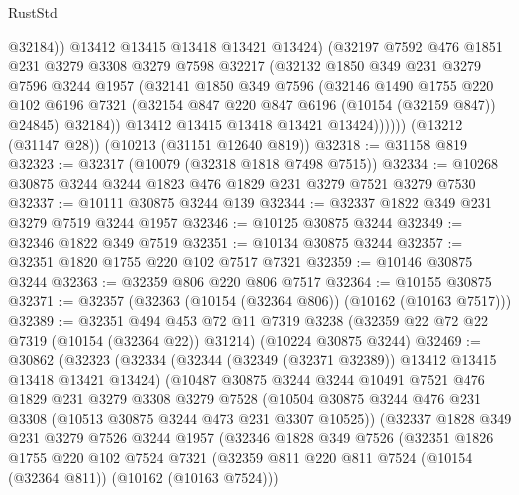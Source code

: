 \begin{lexlean}{RustStd}
\begin{coremodule}
{\begin{coremodule}
{{{{{{{{{{{{{{{{{{{{{{{{{{                  @32184))
              @13412
              @13415
              @13418
              @13421
              @13424)
            (@32197
              @7592
              @476
              @1851
              @231
              @3279
              @3308
              @3279
              @7598
              @32217
              (@32132
                @1850
                @349
                @231
                @3279
                @7596
                @3244
                @1957
                (@32141
                  @1850
                  @349
                  @7596
                  (@32146
                    @1490
                    @1755
                    @220
                    @102
                    @6196
                    @7321
                    (@32154 @847 @220 @847 @6196 (@10154 (@32159 @847)) @24845)
                    @32184))
                @13412
                @13415
                @13418
                @13421
                @13424))))))
    (@13212 (@31147 @28))
    (@10213 (@31151 @12640 @819))
@32318 := @31158 @819
@32323 := @32317 (@10079 (@32318 @1818 @7498 @7515))
@32334 := @10268 @30875 @3244 @3244 @1823 @476 @1829 @231 @3279 @7521 @3279 @7530
@32337 := @10111 @30875 @3244 @139
@32344 := @32337 @1822 @349 @231 @3279 @7519 @3244 @1957
@32346 := @10125 @30875 @3244
@32349 := @32346 @1822 @349 @7519
@32351 := @10134 @30875 @3244
@32357 := @32351 @1820 @1755 @220 @102 @7517 @7321
@32359 := @10146 @30875 @3244
@32363 := @32359 @806 @220 @806 @7517
@32364 := @10155 @30875
@32371 := @32357 (@32363 (@10154 (@32364 @806)) (@10162 (@10163 @7517)))
@32389 := @32351
    @494
    @453
    @72
    @11
    @7319
    @3238
    (@32359 @22 @72 @22 @7319 (@10154 (@32364 @22)) @31214)
    (@10224 @30875 @3244)
@32469 := @30862
    (@32323
      (@32334
        (@32344 (@32349 (@32371 @32389)) @13412 @13415 @13418 @13421 @13424)
        (@10487
          @30875
          @3244
          @3244
          @10491
          @7521
          @476
          @1829
          @231
          @3279
          @3308
          @3279
          @7528
          (@10504 @30875 @3244 @476 @231 @3308 (@10513 @30875 @3244 @473 @231 @3307 @10525))
          (@32337
            @1828
            @349
            @231
            @3279
            @7526
            @3244
            @1957
            (@32346
              @1828
              @349
              @7526
              (@32351
                @1826
                @1755
                @220
                @102
                @7524
                @7321
                (@32359 @811 @220 @811 @7524 (@10154 (@32364 @811)) (@10162 (@10163 @7524)))
}}}}}}}}}}}}}}}}}}}}}}}}}}
\end{coremodule}}
\end{coremodule}
\end{lexlean}
